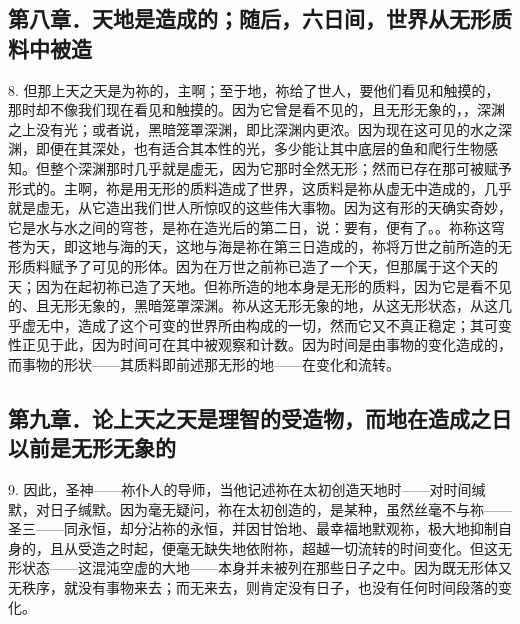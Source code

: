 
\subsection{第八章．天地是造成的；随后，六日间，世界从无形质料中被造}

8. 但那上天之天是为祢的，主啊；至于地，祢给了世人，要他们看见和触摸的，那时却不像我们现在看见和触摸的。因为它曾是看不见的，且无形无象的，，深渊之上没有光；或者说，黑暗笼罩深渊，即比深渊内更浓。因为现在这可见的水之深渊，即便在其深处，也有适合其本性的光，多少能让其中底层的鱼和爬行生物感知。但整个深渊那时几乎就是虚无，因为它那时全然无形；然而已存在那可被赋予形式的。主啊，祢是用无形的质料造成了世界，这质料是祢从虚无中造成的，几乎就是虚无，从它造出我们世人所惊叹的这些伟大事物。因为这有形的天确实奇妙，它是水与水之间的穹苍，是祢在造光后的第二日，说：要有，便有了。。祢称这穹苍为天，即这地与海的天，这地与海是祢在第三日造成的，祢将万世之前所造的无形质料赋予了可见的形体。因为在万世之前祢已造了一个天，但那属于这个天的天；因为在起初祢已造了天地。但祢所造的地本身是无形的质料，因为它是看不见的、且无形无象的，黑暗笼罩深渊。祢从这无形无象的地，从这无形状态，从这几乎虚无中，造成了这个可变的世界所由构成的一切，然而它又不真正稳定；其可变性正见于此，因为时间可在其中被观察和计数。因为时间是由事物的变化造成的，而事物的形状——其质料即前述那无形的地——在变化和流转。\par


\subsection{第九章．论上天之天是理智的受造物，而地在造成之日以前是无形无象的}

9. 因此，圣神——祢仆人的导师，当他记述祢在太初创造天地时——对时间缄默，对日子缄默。因为毫无疑问，祢在太初创造的，是某种，虽然丝毫不与祢——圣三——同永恒，却分沾祢的永恒，并因甘饴地、最幸福地默观祢，极大地抑制自身的，且从受造之时起，便毫无缺失地依附祢，超越一切流转的时间变化。但这无形状态——这混沌空虚的大地——本身并未被列在那些日子之中。因为既无形体又无秩序，就没有事物来去；而无来去，则肯定没有日子，也没有任何时间段落的变化。\par

